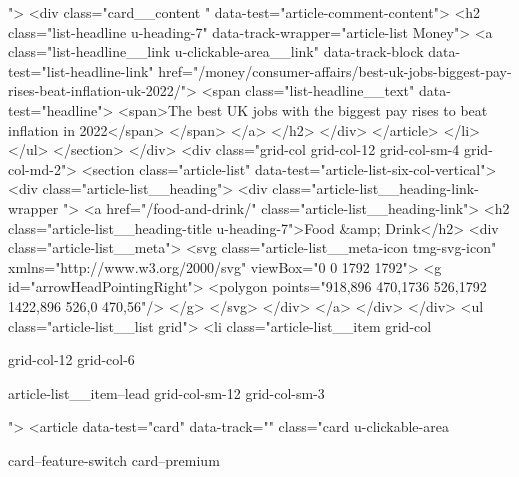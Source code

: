 {{{			
			 ">
<div class="card__content " data-test="article-comment-content">
<h2 class="list-headline  u-heading-7" data-track-wrapper="article-list Money">
<a class="list-headline__link u-clickable-area__link" data-track-block data-test="list-headline-link" href="/money/consumer-affairs/best-uk-jobs-biggest-pay-rises-beat-inflation-uk-2022/">
<span class="list-headline__text" data-test="headline">
<span>The best UK jobs with the biggest pay rises to beat inflation in 2022</span>
</span>
</a>
</h2>
</div>
</article>
</li>
</ul>
</section>
</div>
<div class="grid-col grid-col-12 grid-col-sm-4 grid-col-md-2">
<section class="article-list" data-test="article-list-six-col-vertical">
<div class="article-list__heading">
<div class="article-list__heading-link-wrapper
				">
<a href="/food-and-drink/" class="article-list__heading-link">
<h2 class="article-list__heading-title u-heading-7">Food &amp; Drink</h2>
<div class="article-list__meta">
<svg class="article-list__meta-icon  tmg-svg-icon" xmlns="http://www.w3.org/2000/svg" viewBox="0 0 1792 1792">
<g id="arrowHeadPointingRight">
<polygon points="918,896 470,1736 526,1792 1422,896 526,0 470,56"/>
</g>
</svg>
</div>
</a>
</div>
</div>
<ul class="article-list__list grid">
<li class="article-list__item
				grid-col
				
				
				
				grid-col-12
				grid-col-6
				
				
				
				
				article-list__item--lead grid-col-sm-12
				grid-col-sm-3
				
				
				">
<article data-test="card" data-track="" class="card
			u-clickable-area
			
			card--feature-switch
			card--premium
			
			
			
			
			
}}}
